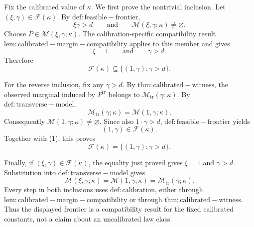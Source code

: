 Fix the calibrated value of \(\kappa\). We first prove the nontrivial inclusion. Let \((\xi,\gamma)\in\mathcal F(\kappa)\). By \(\mathrm{def:feasible-frontier}\),
\[
\xi\gamma>d
\qquad\text{and}\qquad
\mathcal M(\xi,\gamma;\kappa)\ne\varnothing.
\]
Choose \(P\in\mathcal M(\xi,\gamma;\kappa)\). The calibration-specific compatibility result \(\mathrm{lem:calibrated-margin-compatibility}\) applies to this member and gives
\[
\xi=1
\qquad\text{and}\qquad
\gamma>d.
\]
Therefore
\[
\mathcal F(\kappa)\subseteq\{(1,\gamma):\gamma>d\}.
\tag{1}
\]

For the reverse inclusion, fix any \(\gamma>d\). By \(\mathrm{thm:calibrated-witness}\), the observed marginal induced by \(P^{\mathrm{tr}}\) belongs to \(\mathcal M_{\mathrm{tr}}(\gamma;\kappa)\). By \(\mathrm{def:transverse-model}\),
\[
\mathcal M_{\mathrm{tr}}(\gamma;\kappa)=\mathcal M(1,\gamma;\kappa).
\]
Consequently \(\mathcal M(1,\gamma;\kappa)\ne\varnothing\). Since also \(1\cdot\gamma>d\), \(\mathrm{def:feasible-frontier}\) yields
\[
(1,\gamma)\in\mathcal F(\kappa).
\]
Together with (1), this proves
\[
\mathcal F(\kappa)=\{(1,\gamma):\gamma>d\}.
\]

Finally, if \((\xi,\gamma)\in\mathcal F(\kappa)\), the equality just proved gives \(\xi=1\) and \(\gamma>d\). Substitution into \(\mathrm{def:transverse-model}\) gives
\[
\mathcal M(\xi,\gamma;\kappa)
=\mathcal M(1,\gamma;\kappa)
=\mathcal M_{\mathrm{tr}}(\gamma;\kappa).
\]
Every step in both inclusions uses \(\mathrm{def:calibration}\), either through \(\mathrm{lem:calibrated-margin-compatibility}\) or through \(\mathrm{thm:calibrated-witness}\). Thus the displayed frontier is a compatibility result for the fixed calibrated constants, not a claim about an uncalibrated law class.